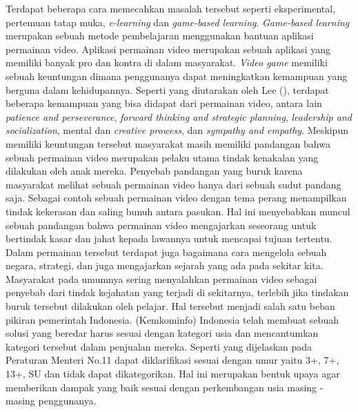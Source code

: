 \linebreak\linebreak
Terdapat beberapa cara memecahkan masalah tersebut seperti eksperimental, pertemuan tatap muka, \textit{e-learning} dan \textit{game-based learning}. \textit{Game-based learning} merupakan sebuah metode pembelajaran menggunakan bantuan aplikasi permainan video. Aplikasi permainan video merupakan sebuah aplikasi yang memiliki banyak pro dan kontra di dalam masyarakat. \textit{Video game} memiliki sebuah keuntungan dimana penggunanya dapat meningkatkan kemampuan yang berguna dalam kehidupannya. Seperti yang diutarakan oleh Lee (\citeyear{paper.lee}), terdapat beberapa kemampuan yang bisa didapat dari permainan video, antara lain \textit{patience and perseverance}, \textit{forward thinking and strategic planning}, \textit{leadership and socialization}, mental dan \textit{creative prowess}, dan \textit{sympathy and empathy}. Meskipun memiliki keuntungan tersebut masyarakat masih memiliki pandangan bahwa sebuah permainan video merupakan pelaku utama tindak kenakalan yang dilakukan oleh anak mereka.
\linebreak\linebreak
Penyebab pandangan yang buruk karena masyarakat melihat sebuah permainan video hanya dari sebuah sudut pandang saja. Sebagai contoh sebuah permainan video dengan tema perang menampilkan tindak kekerasan dan saling bunuh antara pasukan. Hal ini menyebabkan muncul sebuah pandangan bahwa permainan video mengajarkan seseorang untuk bertindak kasar dan jahat kepada lawannya untuk mencapai tujuan tertentu. Dalam permainan tersebut terdapat juga bagaimana cara mengelola sebuah negara, strategi, dan juga mengajarkan sejarah yang ada pada sekitar kita. Masyarakat pada umumnya sering menyalahkan permainan video sebagai penyebab dari tindak kejahatan yang terjadi di sekitarnya, terlebih jika tindakan buruk tersebut dilakukan oleh pelajar.
\linebreak\linebreak
Hal tersebut menjadi salah satu beban pikiran pemerintah Indonesia. \kemkominfo (Kemkominfo) Indonesia telah membuat sebuah solusi \game yang beredar harus sesuai dengan kategori usia dan mencantumkan kategori tersebut dalam penjualan \game mereka. Seperti yang dijelaskan pada Peraturan Menteri No.11 \game dapat diklarifikasi sesuai dengan umur yaitu 3+, 7+, 13+, SU dan tidak dapat dikategorikan. Hal ini merupakan bentuk upaya agar \game memberikan dampak yang baik sesuai dengan perkembangan usia masing - masing penggunanya.
\linebreak\linebreak
